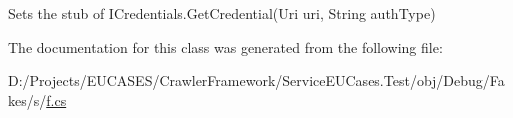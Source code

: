 Sets the stub of I\-Credentials.\-Get\-Credential(\-Uri uri, String auth\-Type)



The documentation for this class was generated from the following file\-:\begin{DoxyCompactItemize}
\item 
D\-:/\-Projects/\-E\-U\-C\-A\-S\-E\-S/\-Crawler\-Framework/\-Service\-E\-U\-Cases.\-Test/obj/\-Debug/\-Fakes/s/\hyperlink{s_2f_8cs}{f.\-cs}\end{DoxyCompactItemize}
